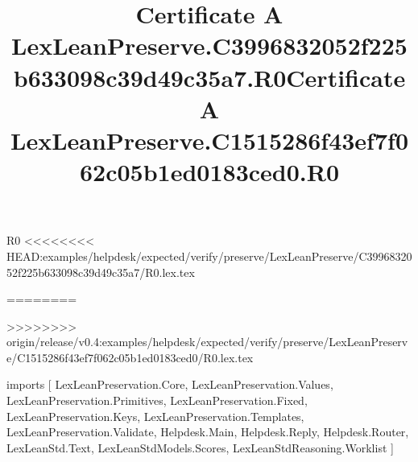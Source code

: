 \begin{lexlean}{R0}
<<<<<<<< HEAD:examples/helpdesk/expected/verify/preserve/LexLeanPreserve/C3996832052f225b633098c39d49c35a7/R0.lex.tex
\title{Certificate A LexLeanPreserve.C3996832052f225b633098c39d49c35a7.R0}
========
\title{Certificate A LexLeanPreserve.C1515286f43ef7f062c05b1ed0183ced0.R0}
>>>>>>>> origin/release/v0.4:examples/helpdesk/expected/verify/preserve/LexLeanPreserve/C1515286f43ef7f062c05b1ed0183ced0/R0.lex.tex
\begin{coremodule}
imports [
  LexLeanPreservation.Core,
  LexLeanPreservation.Values,
  LexLeanPreservation.Primitives,
  LexLeanPreservation.Fixed,
  LexLeanPreservation.Keys,
  LexLeanPreservation.Templates,
  LexLeanPreservation.Validate,
  Helpdesk.Main,
  Helpdesk.Reply,
  Helpdesk.Router,
  LexLeanStd.Text,
  LexLeanStdModels.Scores,
  LexLeanStdReasoning.Worklist
]


\end{coremodule}
\end{lexlean}
